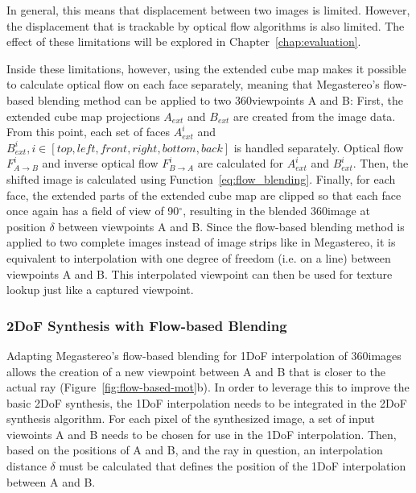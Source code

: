In general, this means that displacement between two images is limited. However, the displacement that is trackable by optical flow algorithms is also limited. The effect of these limitations will be explored in Chapter~\ref{chap:evaluation}.

Inside these limitations, however, using the extended cube map makes it possible to calculate optical flow on each face separately, meaning that Megastereo's flow-based blending method can be applied to two 360\degree viewpoints A and B: First, the extended cube map projections $A_{ext}$ and $B_{ext}$ are created from the image data. From this point, each set of faces $A_{ext}^{i}$ and $B_{ext}^{i}, i \in [top, left, front, right, bottom, back]$ is handled separately. Optical flow $F_{A\to B}^i$ and inverse optical flow $F_{B\to A}^i$ are calculated for $A_{ext}^{i}$ and $B_{ext}^{i}$. Then, the shifted image is calculated using Function~\ref{eq:flow_blending}. Finally, for each face, the extended parts of the extended cube map are clipped so that each face once again has a field of view of 90$^{\circ}$, resulting in the blended 360\degree image at position $\delta$ between viewpoints A and B. Since the flow-based blending method is applied to two complete images instead of image strips like in Megastereo, it is equivalent to interpolation with one degree of freedom (i.e. on a line) between viewpoints A and B. This interpolated viewpoint can then be used for texture lookup just like a captured viewpoint.

\subsubsection{2DoF Synthesis with Flow-based Blending} \label{subsec:2dof_flow-based}
Adapting Megastereo's flow-based blending for 1DoF interpolation of 360\degree images allows the creation of a new viewpoint between A and B that is closer to the actual ray (Figure~\ref{fig:flow-based-mot}b). In order to leverage this to improve the basic 2DoF synthesis, the 1DoF interpolation needs to be integrated in the 2DoF synthesis algorithm. For each pixel of the synthesized image, a set of input viewoints A and B needs to be chosen for use in the 1DoF interpolation. Then, based on the positions of A and B, and the ray in question, an interpolation distance $\delta$ must be calculated that defines the position of the 1DoF interpolation between A and B.

